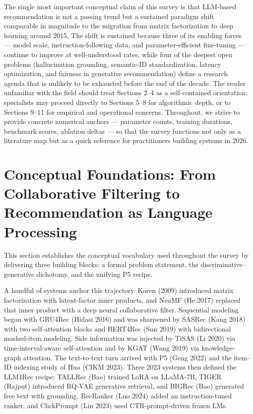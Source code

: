 The single most important conceptual claim of this survey is that LLM-based recommendation is not a passing trend but a sustained paradigm shift comparable in magnitude to the migration from matrix factorization to deep learning around 2015. The shift is sustained because three of its enabling forces --- model scale, instruction-following data, and parameter-efficient fine-tuning --- continue to improve at well-understood rates, while four of the deepest open problems (hallucination grounding, semantic-ID standardization, latency optimization, and fairness in generative recommendation) define a research agenda that is unlikely to be exhausted before the end of the decade. The reader unfamiliar with the field should treat Sections 2--4 as a self-contained orientation; specialists may proceed directly to Sections 5--8 for algorithmic depth, or to Sections 9--11 for empirical and operational concerns. Throughout, we strive to provide concrete numerical anchors --- parameter counts, training durations, benchmark scores, ablation deltas --- so that the survey functions not only as a literature map but as a quick reference for practitioners building systems in 2026.

\section{Conceptual Foundations: From Collaborative Filtering to Recommendation as Language Processing}\label{conceptual-foundations-from-collaborative-filtering-to-recommendation-as-language-processing}

This section establishes the conceptual vocabulary used throughout the survey by delivering three building blocks: a formal problem statement, the discriminative--generative dichotomy, and the unifying P5 recipe.

A handful of systems anchor this trajectory. Koren (2009) introduced matrix factorization with latent-factor inner products, and NeuMF (He 2017) replaced that inner product with a deep neural collaborative filter. Sequential modeling began with GRU4Rec (Hidasi 2016) and was sharpened by SASRec (Kang 2018) with two self-attention blocks and BERT4Rec (Sun 2019) with bidirectional masked-item modeling. Side information was injected by TiSAS (Li 2020) via time-interval-aware self-attention and by KGAT (Wang 2019) via knowledge-graph attention. The text-to-text turn arrived with P5 (Geng 2022) and the item-ID indexing study of Hua (CIKM 2023). Three 2023 systems then defined the LLM4Rec recipe: TALLRec (Bao) trained LoRA on LLaMA-7B, TIGER (Rajput) introduced RQ-VAE generative retrieval, and BIGRec (Bao) generated free text with grounding. RecRanker (Luo 2024) added an instruction-tuned ranker, and ClickPrompt (Lin 2023) used CTR-prompt-driven frozen LMs.

